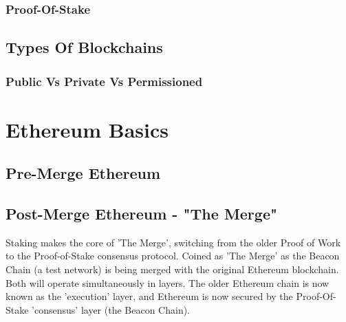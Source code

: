
\subsubsection{Proof-Of-Stake}






\subsection{Types Of Blockchains}




\subsubsection{Public Vs Private Vs Permissioned}



\section{Ethereum Basics}



\subsection{Pre-Merge Ethereum}

\subsection{Post-Merge Ethereum - "The Merge"}

Staking makes the core of 'The Merge', switching from the older Proof of Work to the Proof-of-Stake consensus protocol. Coined as 'The Merge' as the Beacon Chain (a test network) is being merged with the original Ethereum blockchain. Both will operate simultaneously in layers. The older Ethereum chain is now known as the 'execution' layer, and Ethereum is now secured by the Proof-Of-Stake 'consensus' layer (the Beacon Chain). 

